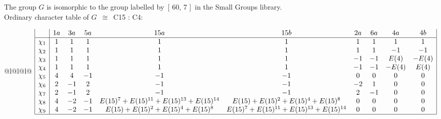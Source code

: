\documentclass[varwidth=\maxdimen,border=10]{standalone}
\begin{document}
The group $G$ is isomorphic to the group labelled by\ [ 60, 7 ]\ in the Small Groups library.\\
Ordinary character table of $G$\ $\cong$\ C15 : C4:\\
\begin{center}
\begin{tabular}{@{}l@{}l@{}l@{}}
\hline
\(\begin{array}{|l|ccccccccc|}
  & 1a & 3a & 5a & 15a & 15b & 2a & 6a & 4a & 4b\\ \hline
\chi_{1} & 1 & 1 & 1 & 1 & 1 & 1 & 1 & 1 & 1\\
\chi_{2} & 1 & 1 & 1 & 1 & 1 & 1 & 1 & -1 & -1\\
\chi_{3} & 1 & 1 & 1 & 1 & 1 & -1 & -1 & E(4) & -E(4)\\
\chi_{4} & 1 & 1 & 1 & 1 & 1 & -1 & -1 & -E(4) & E(4)\\
\chi_{5} & 4 & 4 & -1 & -1 & -1 & 0 & 0 & 0 & 0\\
\chi_{6} & 2 & -1 & 2 & -1 & -1 & -2 & 1 & 0 & 0\\
\chi_{7} & 2 & -1 & 2 & -1 & -1 & 2 & -1 & 0 & 0\\
\chi_{8} & 4 & -2 & -1 & E(15)^{7}+E(15)^{11}+E(15)^{13}+E(15)^{14} & E(15)+E(15)^{2}+E(15)^{4}+E(15)^{8} & 0 & 0 & 0 & 0\\
\chi_{9} & 4 & -2 & -1 & E(15)+E(15)^{2}+E(15)^{4}+E(15)^{8} & E(15)^{7}+E(15)^{11}+E(15)^{13}+E(15)^{14} & 0 & 0 & 0 & 0\\
\hline
\end{array}\)\\
\end{tabular}
\end{center}
\end{document}
